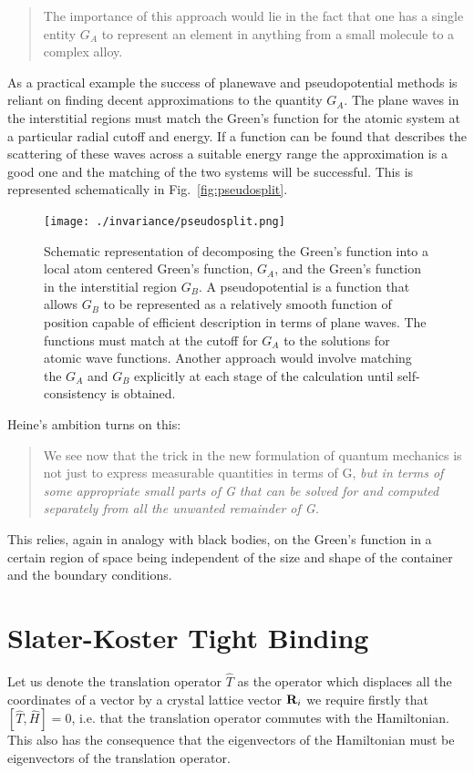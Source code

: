\begin{quote}
The importance of this approach would lie in the fact that
one has a single entity $G_{A}$ to represent an element in anything 
from a small molecule to a complex alloy.
\end{quote}

As a practical example the success of planewave and pseudopotential methods 
is reliant on finding decent approximations to the quantity $G_{A}$. The plane waves
in the interstitial regions must match the Green's function for the atomic system
at a particular radial cutoff and energy. If a function can be found that 
describes the scattering of these waves across a suitable energy range the approximation 
is a good one and the matching of the two systems will be successful. This
is represented schematically in Fig.~\ref{fig:pseudosplit}.
%
\begin{figure}
\begin{center}
\texttt{[image: ./invariance/pseudosplit.png]}
\caption{Schematic representation of decomposing the Green's function into a local atom centered
Green's function, $G_{A}$, and the Green's function in the interstitial region $G_{B}$.
A pseudopotential is a function that allows $G_{B}$ to be represented as a relatively
smooth function of position capable of efficient description in terms of plane waves.
The functions must match at the cutoff for $G_{A}$ to the solutions for 
atomic wave functions. Another approach would involve matching the $G_{A}$ 
and $G_{B}$ explicitly at each stage of the calculation until self-consistency is obtained.}
\end{center}
\end{figure}
%
Heine's ambition turns on this:
%
\begin{quote}
We see now that the trick in the new formulation of quantum 
mechanics is not just to express measurable quantities in terms of 
G, {\it but in terms of some appropriate small parts of G that can be solved 
for and computed separately from all the unwanted remainder of G.}
\end{quote}
%
This relies, again in analogy with black bodies, on the Green's
function in a certain region of space being independent of the size and shape
of the container and the boundary conditions.

\section{Slater-Koster Tight Binding}
  Let us denote the translation operator $\hat{T}$
as the operator which displaces all the coordinates of a vector 
by a crystal lattice vector ${\bf R}_{i}$ we require 
firstly that $[\hat{T},\hat{H}]=0$, i.e. that the 
translation operator commutes with the Hamiltonian. This also
has the consequence that the eigenvectors of the Hamiltonian
must be eigenvectors of the translation operator. 

